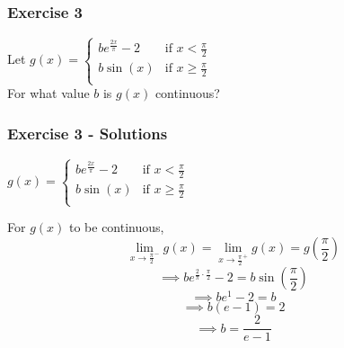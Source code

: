 \documentclass[12pt]{beamer}
\begin{document}
\begin{frame}
	\frametitle{Exercise 3}
	\large
	\begin{center}
		Let $g(x) =
			\begin{cases}
				be^{\frac{2x}{\pi}}-2 & \text{if } x < \frac{\pi}{2}    \\
				b\sin(x)              & \text{if } x \geq \frac{\pi}{2} \\
			\end{cases}
		$\\
		\vspace*{\fill}
		\Large
		For what value $b$ is $g(x)$ continuous?
	\end{center}
\end{frame}
\begin{frame}
	\frametitle{Exercise 3 - Solutions}

	\large
	\begin{center}
		$g(x) =
			\begin{cases}
				be^{\frac{2x}{\pi}}-2 & \text{if } x < \frac{\pi}{2}    \\
				b\sin(x)              & \text{if } x \geq \frac{\pi}{2} \\
			\end{cases}
		$\\
		\vspace*{\fill}
	\end{center}
	For $g(x)$ to be continuous,
	\[\displaystyle\lim_{x\to\frac{\pi}{2}^{-}}g(x)=\displaystyle\lim_{x\to\frac{\pi}{2}^{+}}g(x)=g\left(\frac{\pi}{2}\right)\]
	\[\implies be^{\frac{2}{\pi}\cdot\frac{\pi}{2}}-2 = b\sin\left(\frac{\pi}{2}\right)\]
	\[\implies be^1 - 2 = b\]
	\[\implies b(e-1) = 2\]
	\[\implies \boxed{b = \frac{2}{e-1}}\]
\end{frame}
\end{document}
